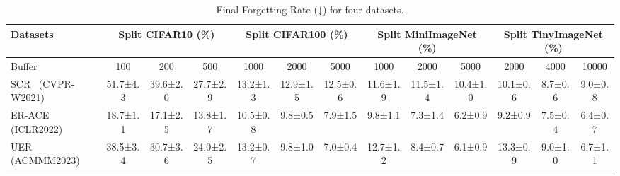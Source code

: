 \begin{table}[t]\small
\renewcommand\tabcolsep{2pt}
\centering
\caption{Final Forgetting Rate (↓) for four datasets.}
\vspace{-1ex}
\label{tableforget}
\begin{tabular}{l|ccc|ccc|ccc|ccc}
\hline
Datasets & \multicolumn{3}{c|}{Split CIFAR10 (\%)} & \multicolumn{3}{c|}{Split CIFAR100 (\%)}& \multicolumn{3}{c|}{Split MiniImageNet (\%)} & \multicolumn{3}{c}{Split TinyImageNet (\%)}\\ \hline
Buffer & \multicolumn{1}{c|}{100} & \multicolumn{1}{c|}{200} & \multicolumn{1}{c|}{500} & \multicolumn{1}{c|}{1000}    & \multicolumn{1}{c|}{2000} & \multicolumn{1}{c|}{5000} & \multicolumn{1}{c|}{1000} & \multicolumn{1}{c|}{2000}     &\multicolumn{1}{c|}{5000} & \multicolumn{1}{c|}{2000} & \multicolumn{1}{c|}{4000} & 10000     \\ \hline
SCR~\cite{mai2021supervised} (CVPR-W2021)   & 51.7\scriptsize±4.3 & 39.6\scriptsize±2.0                 & 27.7\scriptsize±2.9                 & 13.2\scriptsize±1.3                  & 12.9\scriptsize±1.5                  & 12.5\scriptsize±0.6 & 11.6\scriptsize±1.9                   & 11.5\scriptsize±1.4                  & 10.4\scriptsize±1.0 & 10.1\scriptsize±0.6                   & 8.7\scriptsize±0.6                  & 9.0\scriptsize±0.8\\
ER-ACE~\cite{caccia2021new} (ICLR2022)   & {18.7\scriptsize±1.1}& {17.1\scriptsize±2.5}                 & {13.8\scriptsize±1.7}                 & {10.5\scriptsize±0.8}                  & {9.8\scriptsize±0.5}                  & {7.9\scriptsize±1.5} & {9.8\scriptsize±1.1}                   & {7.3\scriptsize±1.4}                  & {6.2\scriptsize±0.9} & {9.2\scriptsize±0.9}                   & {7.5\scriptsize±0.4}                  & {6.4\scriptsize±0.7}\\
UER~\cite{lin2023uer} (ACMMM2023)   & {38.5\scriptsize±3.4}  & {30.7\scriptsize±3.6}  & {24.0\scriptsize±2.5}                 & {13.2\scriptsize±0.7}  & {9.8\scriptsize±1.0}  & {7.0\scriptsize±0.4} & {12.7\scriptsize±1.2}  & {8.4\scriptsize±0.7}  & {6.1\scriptsize±0.9} & 13.3\scriptsize±0.9                   & 9.0\scriptsize±1.0                  & 6.7\scriptsize±1.1\\
\hline


\end{tabular}
\end{table}
